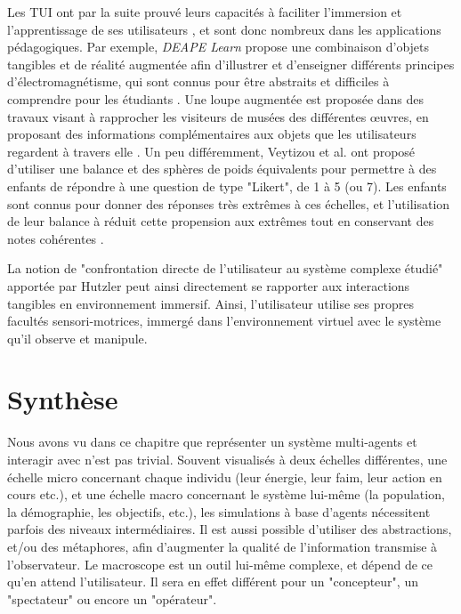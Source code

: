 			Les TUI ont par la suite prouvé leurs capacités à faciliter l'immersion et l'apprentissage de ses utilisateurs \cite{zuckerman_tui_2013, fleck_marker-based_2015, cheng_affordances_2013}, et sont donc nombreux dans les applications pédagogiques. Par exemple, \textit{DEAPE Learn} propose une combinaison d'objets tangibles et de réalité augmentée afin d'illustrer et d'enseigner différents principes d'électromagnétisme, qui sont connus pour être abstraits et difficiles à comprendre pour les étudiants \cite{da_costa_realite_2019}. Une loupe augmentée est proposée dans des travaux visant à rapprocher les visiteurs de musées des différentes œuvres, en proposant des informations complémentaires aux objets que les utilisateurs regardent à travers elle  \cite{damala_loupe_2016}. Un peu différemment, Veytizou et al. ont proposé d'utiliser une balance et des sphères de poids équivalents pour permettre à des enfants de répondre à une question de type "Likert", de 1 à 5 (ou 7). Les enfants sont connus pour donner des réponses très extrêmes à ces échelles, et l'utilisation de leur balance à réduit cette propension aux extrêmes tout en conservant des notes cohérentes \cite{veytizou_could_2018}.
	
	La notion de "confrontation directe de l'utilisateur au système complexe étudié" apportée par Hutzler \cite{hutzler_du_2000} peut ainsi directement se rapporter aux interactions tangibles en environnement immersif. Ainsi, l'utilisateur utilise ses propres facultés sensori-motrices, immergé dans l'environnement virtuel avec le système qu'il observe et manipule.
	
				
	\section*{Synthèse}
	
		Nous avons vu dans ce chapitre que représenter un système multi-agents et interagir avec n'est pas trivial. Souvent visualisés à deux échelles différentes, une échelle micro concernant chaque individu (leur énergie, leur faim, leur action en cours etc.), et une échelle macro concernant le système lui-même (la population, la démographie, les objectifs, etc.), les simulations à base d'agents nécessitent parfois des niveaux intermédiaires. Il est aussi possible d'utiliser des abstractions, et/ou des métaphores, afin d'augmenter la qualité de l'information transmise à l'observateur. Le macroscope est un outil lui-même complexe, et dépend de ce qu'en attend l'utilisateur. Il sera en effet différent pour un "concepteur", un "spectateur" ou encore un "opérateur".
		
